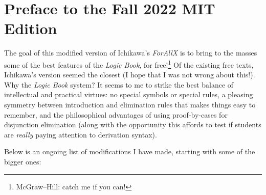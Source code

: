 
\chapter*{Preface to the Fall 2022 MIT Edition}
\label{ch.preface2}

The goal of this modified version of Ichikawa's \textit{ForAllX} is to bring to the masses some of the best features of the \textit{Logic Book}, for free!\footnote{McGraw--Hill: catch me if you can!} Of the existing free texts, Ichikawa's version seemed the closest (I hope that I was not wrong about this!). Why the \textit{Logic Book} system? It seems to me to strike the best balance of intellectual and practical virtues: no special symbols or special rules, a pleasing symmetry between introduction and elimination rules that makes things easy to remember, and the philosophical advantages of using proof-by-cases for disjunction elimination (along with the opportunity this affords to test if students are \textit{really} paying attention to derivation syntax). 

Below is an ongoing list of modifications I have made, starting with some of the bigger ones:

